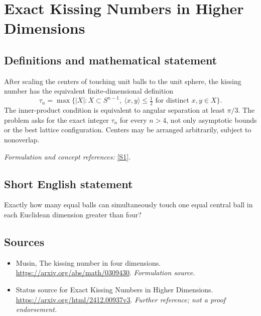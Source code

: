 \documentclass[11pt]{article}
\begin{document}
\section*{\texorpdfstring{Exact Kissing Numbers in Higher Dimensions}{Exact Kissing Numbers in Higher Dimensions}}\label{110}
\subsection{Definitions and mathematical statement}
After scaling the centers of touching unit balls to the unit sphere, the kissing number has the equivalent finite-dimensional definition
\[
 \tau_n=\max\bigl\{|X|:X\subset S^{n-1},\ \langle x,y\rangle\le\tfrac12
                                  \text{ for distinct }x,y\in X\bigr\}.
\]
The inner-product condition is equivalent to angular separation at least $\pi/3$. The problem asks for the exact integer $\tau_n$ for every $n>4$, not only asymptotic bounds or the best lattice configuration. Centers may be arranged arbitrarily, subject to nonoverlap.
\par\smallskip\textit{Formulation and concept references:} \href{https://arxiv.org/abs/math/0309430}{[S1]}.

\subsection{Short English statement}
Exactly how many equal balls can simultaneously touch one equal central ball in each Euclidean dimension greater than four?
\subsection{Sources}
\begin{itemize}
\item[S1]Musin, The kissing number in four dimensions.
\url{https://arxiv.org/abs/math/0309430}.
\textit{Formulation source.}
\item[S2]Status source for Exact Kissing Numbers in Higher Dimensions.
\url{https://arxiv.org/html/2412.00937v3}.
\textit{Further reference; not a proof endorsement.}
\end{itemize}
\end{document}
